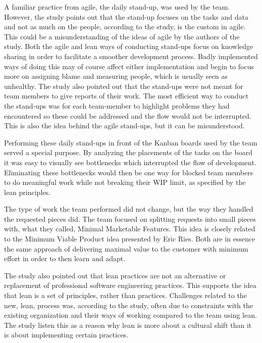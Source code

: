 A familiar practice from agile, the daily stand-up, was used by the team. However, the study points out that the stand-up focuses on the tasks and data and not as much on the people, according to the study, is the custom in agile.\cite{Middleton2012Lean} This could be a misunderstanding of the ideas of agile by the authors of the study. Both the agile and lean ways of conducting stand-ups focus on knowledge sharing in order to facilitate a smoother development process. Badly implemented ways of doing this may of course affect either implementation and begin to focus more on assigning blame and measuring people, which is usually seen as unhealthy. The study also pointed out that the stand-ups were not meant for team members to give reports of their work. The most efficient way to conduct the stand-ups was for each team-member to highlight problems they had encountered so these could be addressed and the flow would not be interrupted.\cite{Middleton2012Lean} This is also the idea behind the agile stand-ups, but it can be misunderstood.

Performing these daily stand-ups in front of the Kanban boards used by the team served a special purpose. By analyzing the placements of the tasks on the board it was easy to visually see bottlenecks which interrupted the flow of development. Eliminating these bottlenecks would then be one way for blocked team members to do meaningful work while not breaking their WIP limit, as specified by the lean principles.\cite{Middleton2012Lean}

The type of work the team performed did not change, but the way they handled the requested pieces did. The team focused on splitting requests into small pieces with, what they called, Minimal Marketable Features.\cite{Middleton2012Lean} This idea is closely related to the Minimum Viable Product idea presented by Eric Ries. \cite{ries2011lean} Both are in essence the same approach of delivering maximal value to the customer with minimum effort in order to then learn and adapt.

The study also pointed out that lean practices are not an alternative or replacement of professional software engineering practices.\cite{Middleton2012Lean} This supports the idea that lean is a set of principles, rather than practices. Challenges related to the new, lean, process was, according to the study, often due to constraints with the existing organization and their ways of working compared to the team using lean. The study listen this as a reason why lean is more about a cultural shift than it is about implementing certain practices. \cite{Middleton2012Lean}


